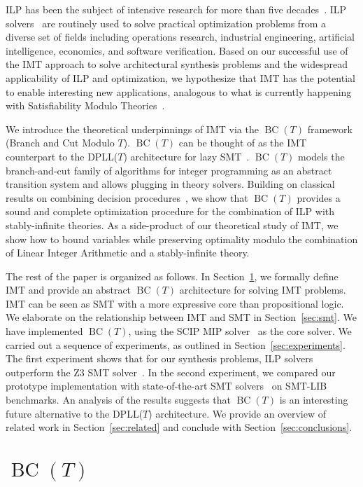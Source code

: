 \documentclass{llncs}
\newcommand{\bct}[0]{\ensuremath{\operatorname{BC}(T)}}
\newcommand{\dpllt}[0]{DPLL($T$)}
\begin{document}
ILP has been the subject of intensive research for more than five
decades~\cite{gomory63}. ILP solvers~\cite{cplex,scip} are routinely
used to solve practical optimization problems from a diverse set of
fields including operations research, industrial engineering,
artificial intelligence, economics, and software verification. Based
on our successful use of the IMT approach to solve architectural
synthesis problems and the widespread applicability of ILP and
optimization, we hypothesize that IMT has the potential to enable
interesting new applications, analogous to what is currently happening
with Satisfiability Modulo
Theories~\cite{barrett02,demoura02,dpllt,z3}.

We introduce the theoretical underpinnings of IMT via the \bct{}
framework (Branch and Cut Modulo $T$). \bct{} can be thought of as the
IMT counterpart to the \dpllt{} architecture for lazy
SMT~\cite{dpllt}. \bct{} models the branch-and-cut family of
algorithms for integer programming as an abstract transition system
and allows plugging in theory solvers. Building on classical results
on combining decision procedures~\cite{no79,noproof,combiningdp}, we
show that \bct{} provides a sound and complete optimization procedure
for the combination of ILP with stably-infinite theories. As a
side-product of our theoretical study of IMT, we show how to bound
variables while preserving optimality modulo the combination of Linear
Integer Arithmetic and a stably-infinite theory.

The rest of the paper is organized as follows. In
Section~\ref{sec:bct}, we formally define IMT and provide an abstract
\bct{} architecture for solving IMT problems. IMT can be seen as SMT
with a more expressive core than propositional logic.  We elaborate on
the relationship between IMT and SMT in Section~\ref{sec:smt}.  We
have implemented \bct{}, using the SCIP MIP solver~\cite{scip} as the
core solver. We carried out a sequence of experiments, as outlined in
Section~\ref{sec:experiments}. The first experiment shows that for our
synthesis problems, ILP solvers~\cite{cplex,scip} outperform the Z3
SMT solver~\cite{z3}.  In the second experiment, we compared our
prototype implementation with state-of-the-art SMT
solvers~\cite{z3,mathsatlia} on SMT-LIB benchmarks. An analysis of the
results suggests that \bct{} is an interesting future alternative to
the \dpllt{} architecture.  We provide an overview of related work in
Section~\ref{sec:related} and conclude with
Section~\ref{sec:conclusions}.

\section{\bct{}}
\label{sec:bct}
\end{document}
